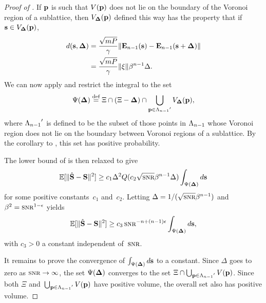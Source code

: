 \begin{subappendices}
\begin{proof}[Proof of ]
    If $\mathbf{p}$ is such that $V(\mathbf{p})$ does not lie on the boundary of the Voronoi
    region of a sublattice, then ${V_{\mathbf{\Delta}}}(\mathbf{p})$ defined this way has the property
    that if $\mathbf{s} \in {V_{\mathbf{\Delta}}}(\mathbf{p})$,
    \begin{align*}
      d(\mathbf{s},\mathbf{\Delta}) &= \frac{\sqrt{mP}}{\gamma} \| \mathbf{E}_{n-1}(\mathbf{s}) - \mathbf{E}_{n-1}(\mathbf{s} +
      \mathbf{\Delta}) \| \\
      &= \frac{\sqrt{mP}}{\gamma} \| \mathbf{\xi} \| \beta^{n-1} \Delta.
    \end{align*}
    We can now apply  and restrict the integral to the set
    \[ \Psi(\mathbf{\Delta}) \stackrel{\text{def}}{=} \Xi \cap (\Xi - \mathbf{\Delta}) \cap \bigcup_{\mathbf{p} \in {\Lambda_{n-1}}'} {V_{\mathbf{\Delta}}}(\mathbf{p}),
    \]
    where ${\Lambda_{n-1}}'$ is defined to be the subset of those points in ${\Lambda_{n-1}}$ whose
    Voronoi region does not lie on the boundary between Voronoi regions of a
    sublattice. By the corollary to , this set has positive
    probability.

    The lower bound of  is then relaxed to give
    \begin{equation*}
      \msev \ge c_1 \Delta^2 Q(c_2 \sqrt{\snr} \beta^{n-1} \Delta) 
      \int_{\Psi(\Dv)} d\s
    \end{equation*}
    for some positive constants~$c_1$ and~$c_2$. Letting $\Delta =
    1/(\sqrt{\snr} \beta^{n-1})$ and $\beta^2 = \snr^{1-\e}$ yields
    \begin{equation*}
      \msev \ge c_3 \snr^{-n+(n-1)\e} \int_{\Psi(\Dv)} d\s,
    \end{equation*}
    with $c_3 > 0$ a constant independent of~$\snr$.

    It remains to prove the convergence of $\int_{\Psi(\mathbf{\Delta})} d\mathbf{s}$ to a constant.
    Since $\Delta$ goes to zero as $\snr \goesto \infty$, the set $\Psi(\mathbf{\Delta})$
    converges to the set $\Xi \cap \bigcup_{\mathbf{p} \in {\Lambda_{n-1}}'} V(\mathbf{p})$. Since both
    $\Xi$ and~$\bigcup_{\mathbf{p} \in {\Lambda_{n-1}}'} V(\mathbf{p})$ have positive volume, the overall
    set also has positive volume.
  \end{proof}



\end{subappendices}
